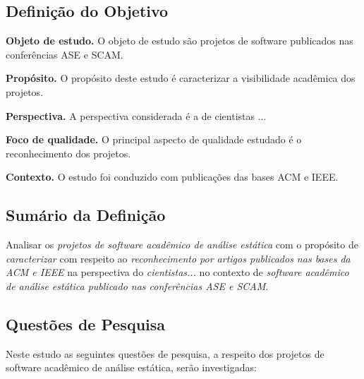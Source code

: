 \subsection{Definição do Objetivo}

\begin{description}
\item{\bf Objeto de estudo.} 
O objeto de estudo são projetos de software publicados nas conferências ASE e SCAM.

\item{\bf Propósito.} 
O propósito deste estudo é caracterizar a visibilidade acadêmica dos projetos.

\item{\bf Perspectiva.} 
A perspectiva considerada é a de cientistas ...

\item{\bf Foco de qualidade.} 
O principal aspecto de qualidade estudado é o reconhecimento dos projetos.

\item{\bf Contexto.} 
O estudo foi conduzido com publicações das bases ACM e IEEE.
\end{description}

\subsection{Sumário da Definição}

Analisar os \textit{projetos de software acadêmico de análise estática}
com o propósito de \textit{caracterizar}
com respeito ao \textit{reconhecimento por artigos publicados nas bases da ACM e IEEE}
na perspectiva do \textit{cientistas...}
no contexto de \textit{software acadêmico de análise estática publicado nas conferências ASE e SCAM}.

\subsection{Questões de Pesquisa}

Neste estudo as seguintes questões de pesquisa, a respeito dos projetos de
software acadêmico de análise estática, serão investigadas:

\newcommand{\EstudoDoisQuestaoUm}{Como os projetos de software acadêmico de
análise estática publicados nas conferências ASE e SCAM são mencionados em
publicações das bases ACM e IEEE?}

\newcommand{\EstudoDoisQuestaoDois}{Os projetos de software acadêmico de
análise estática publicados nas conferências ASE e SCAM são avaliados em
estudos encontrados nas bases ACM e IEEE?}

